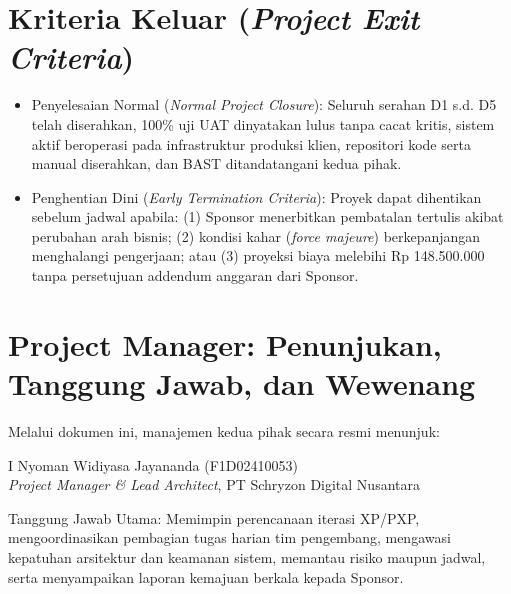 \documentclass[11pt,a4paper]{article}
\begin{document}
\clearpage
\begingroup
\setlength{\parskip}{3pt}
\section{Kriteria Keluar (\textit{Project Exit Criteria})}

\begin{itemize}[leftmargin=1.5em, itemsep=1pt, topsep=1pt]
    \item Penyelesaian Normal (\textit{Normal Project Closure}): Seluruh serahan D1 s.d. D5 telah diserahkan, 100\% uji UAT dinyatakan lulus tanpa cacat kritis, sistem aktif beroperasi pada infrastruktur produksi klien, repositori kode serta manual diserahkan, dan BAST ditandatangani kedua pihak.
    \item Penghentian Dini (\textit{Early Termination Criteria}): Proyek dapat dihentikan sebelum jadwal apabila: (1) Sponsor menerbitkan pembatalan tertulis akibat perubahan arah bisnis; (2) kondisi kahar (\textit{force majeure}) berkepanjangan menghalangi pengerjaan; atau (3) proyeksi biaya melebihi Rp 148.500.000 tanpa persetujuan addendum anggaran dari Sponsor.
\end{itemize}

\vspace{-6pt}
\section{Project Manager: Penunjukan, Tanggung Jawab, dan Wewenang}

Melalui dokumen ini, manajemen kedua pihak secara resmi menunjuk:
\begin{center}\vspace{-4pt}
    I Nyoman Widiyasa Jayananda (F1D02410053) \\
    \textit{Project Manager \& Lead Architect}, PT Schryzon Digital Nusantara
\end{center}\vspace{-4pt}

Tanggung Jawab Utama: Memimpin perencanaan iterasi XP/PXP, mengoordinasikan pembagian tugas harian tim pengembang, mengawasi kepatuhan arsitektur dan keamanan sistem, memantau risiko maupun jadwal, serta menyampaikan laporan kemajuan berkala kepada Sponsor.
\end{document}
